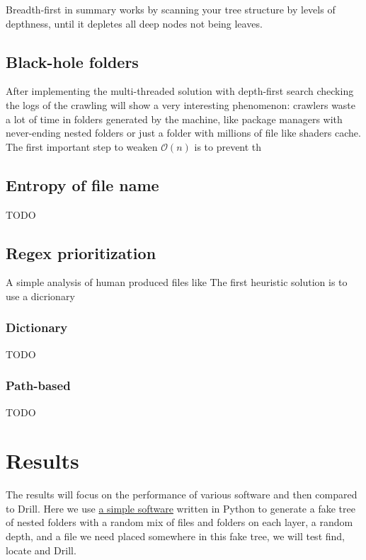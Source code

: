 \documentclass[12pt]{article}
\newcommand{\bigO}{\mathcal{O}}
\begin{document}
Breadth-first in summary works by scanning your tree structure by levels of depthness, until it depletes all deep nodes not being leaves.


\subsection{Black-hole folders}

After implementing the multi-threaded solution with depth-first search checking the logs of the crawling will show a very interesting phenomenon: crawlers waste a lot of time in folders generated by the machine, like package managers with never-ending nested folders or just a folder with millions of file like shaders cache.
The first important step to weaken $\bigO(n)$ is to prevent th






\subsection{Entropy of file name}

TODO

\subsection{Regex prioritization}

A simple analysis of human produced files like 
The first heuristic solution is to use a dicrionary 

\subsubsection{Dictionary}

TODO

\subsubsection{Path-based}

TODO




\section{Results}

The results will focus on the performance of various software and then compared to Drill.
Here we use \href{http://github.com/yatima1460/Fake-Filesystem-Generator}{a simple software} written in Python to generate a fake tree of nested folders with a random mix of files and folders on each layer, a random depth, and a file we need placed somewhere in this fake tree, we will test find, locate and Drill.
\end{document}
